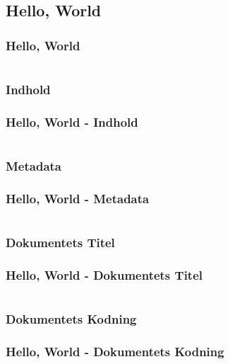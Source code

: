 \subsection{Hello, World}
\begin{frame}
    \frametitle{Hello, World}
    \inputminted{html}{../src/frontend/part1_html_hello/index.html}
\end{frame}

\subsubsection{Indhold}
\begin{frame}
    \frametitle{Hello, World - Indhold}
    \inputminted[highlightlines={6-8}]{html}{../src/frontend/part1_html_hello/index.html}
\end{frame}

\subsubsection{Metadata}
\begin{frame}
    \frametitle{Hello, World - Metadata}
    \inputminted[highlightlines={2-5}]{html}{../src/frontend/part1_html_hello/index.html}
\end{frame}

\subsubsection{Dokumentets Titel}
\begin{frame}
    \frametitle{Hello, World - Dokumentets Titel}
    \inputminted[highlightlines={3}]{html}{../src/frontend/part1_html_hello/index.html}
\end{frame}

\subsubsection{Dokumentets Kodning}
\begin{frame}
    \frametitle{Hello, World - Dokumentets Kodning}
    \inputminted[highlightlines={4}]{html}{../src/frontend/part1_html_hello/index.html}
\end{frame}


